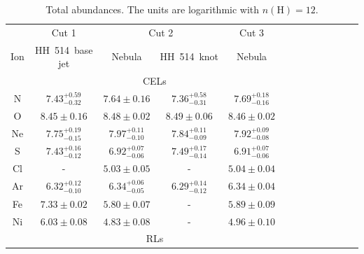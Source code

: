 \documentclass[fleqn,usenatbib]{mnras}
\newcommand{\jorge}[1]{{\color{magenta}J: #1}}
\begin{document}


\begin{table}
\centering
\caption{Total abundances. The units are logarithmic with $n(\text{H})=12$.}
\label{tab:total_abundances}
\begin{tabular}{ccccccccccccc}
\hline
 & \multicolumn{1}{c}{Cut 1} & \multicolumn{2}{c}{Cut 2} & \multicolumn{1}{c}{Cut 3} & \\
Ion &  HH~514~base jet & Nebula & HH~514~knot  & Nebula \\
\hline
 & \multicolumn{4}{c}{CELs}\\

N  & $7.43 ^{+0.59} _{-0.32}$ & $7.64 \pm 0.16$ &$7.36 ^{+0.58} _{-0.31}$ & $7.69 ^{+0.18} _{-0.16}$ \\ 

O  & $8.45 \pm 0.16$ & $8.48 \pm 0.02$ &$8.49 \pm 0.06$&$8.46 \pm 0.02$\\

Ne & $7.75 ^{+0.19} _{-0.15}$ & $7.97 ^{+0.11} _{-0.10}$& $7.84 ^{+0.11} _{-0.09}$ & $7.92 ^{+0.09} _{-0.08}$ \\ 

S  & $7.43 ^{+0.16} _{-0.12}$ & $6.92 ^{+0.07} _{-0.06}$& $7.49 ^{+0.17} _{-0.14}$ &$6.91 ^{+0.07} _{-0.06}$\\

Cl & - & $5.03 \pm 0.05$&- &$5.04 \pm 0.04$\\

Ar & $6.32 ^{+0.12} _{-0.10}$ & $6.34 ^{+0.06} _{-0.05}$ & $6.29 ^{+0.14} _{-0.12}$& $6.34 \pm 0.04$\\

Fe & $7.33 \pm 0.02$ & $5.80 \pm 0.07$ & - &$5.89 \pm 0.09$\\


Ni & $6.03 \pm 0.08$ & $4.83 \pm 0.08 $&-&$4.96 \pm 0.10$\\

 & \multicolumn{4}{c}{RLs}\\


\end{tabular}
\end{table}
\end{document}
